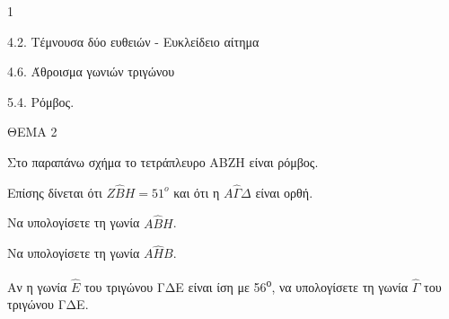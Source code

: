 \begin{ylh}{1}
    \item 4.2. Τέμνουσα δύο ευθειών - Ευκλείδειο αίτημα
    \item 4.6. Άθροισμα γωνιών τριγώνου
    \item 5.4. Ρόμβος.
\end{ylh}

ΘΕΜΑ 2



Στο παραπάνω σχήμα το τετράπλευρο ΑΒΖΗ είναι ρόμβος.

Επίσης δίνεται ότι $Ζ\widehat{Β}Η = 51^{ο}$ και ότι η $Α\widehat{\Gamma}\Delta$ είναι ορθή.

\begin{alist}
\item Να υπολογίσετε τη γωνία $Α\widehat{Β}Η$. 

\item Να υπολογίσετε τη γωνία $Α\widehat{Η}Β$. 

\item Αν η γωνία $\widehat{Ε}$ του τριγώνου ΓΔΕ είναι ίση με 56\textsuperscript{ο}, να υπολογίσετε τη γωνία $\widehat{\Gamma}$ του τριγώνου ΓΔΕ. 
\end{alist}
